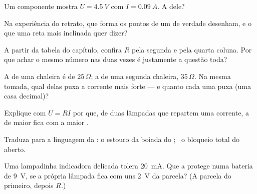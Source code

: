 \begin{exercise}[$\star$]\label{exo:g8:ohms-law:3}
Um componente mostra $U = \qty{4.5}{V}$ com $I = \qty{0.09}{A}$. A
 dele?
\end{exercise}

\begin{exercise}[$\star$]\label{exo:g8:ohms-law:4}
Na experiência do retrato, que forma os pontos de um  de
verdade desenham, e o que uma reta mais inclinada quer dizer?
\end{exercise}

\begin{exercise}[$\star$]\label{exo:g8:ohms-law:5}
A partir da tabela do capítulo, confira $R$ pela segunda e pela
quarta coluna. Por que achar o mesmo número nas duas vezes é
justamente a questão toda?
\end{exercise}

\begin{exercise}[$\star$]\label{exo:g8:ohms-law:6}
A  de uma chaleira é de $25\,\Omega$; a de uma segunda
chaleira, $35\,\Omega$. Na mesma tomada, qual delas puxa a corrente
mais forte --- e quanto cada uma puxa (uma casa decimal)?
\end{exercise}

\begin{exercise}[$\star$]\label{exo:g8:ohms-law:7}
Explique com $U = R I$ por que, de duas lâmpadas  que
repartem uma corrente, a de maior  fica com a maior
.
\end{exercise}

\begin{exercise}[$\star$]\label{exo:g8:ohms-law:8}
Traduza para a linguagem da : o estouro da boiada do
; \ o bloqueio total do  aberto.
\end{exercise}

\begin{exercise}[$\star\star$]\label{exo:g8:ohms-law:9}
Uma lampadinha indicadora delicada tolera \qty{20}{mA}. Que 
 a protege numa bateria de \qty{9}{V}, se a própria lâmpada
fica com uns \qty{2}{V} da parcela? (A parcela do  primeiro,
depois $R$.)
\end{exercise}

